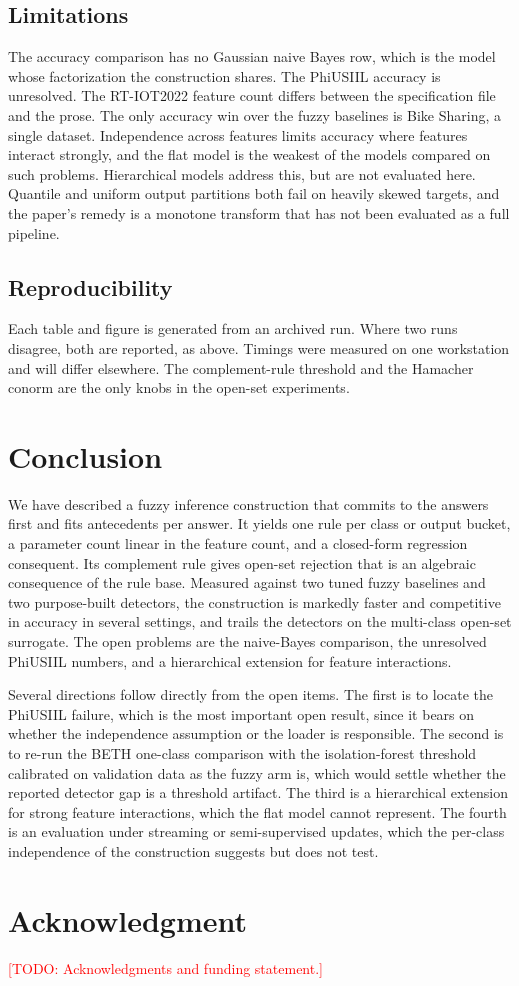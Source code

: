 \documentclass[journal]{IEEEtran}
\newcommand{\todo}[1]{\textcolor{red}{[TODO: #1]}}
\begin{document}
\subsection{Limitations}
The accuracy comparison has no Gaussian naive Bayes row, which is the model whose factorization the construction shares. The PhiUSIIL accuracy is unresolved. The RT-IOT2022 feature count differs between the specification file and the prose. The only accuracy win over the fuzzy baselines is Bike Sharing, a single dataset. Independence across features limits accuracy where features interact strongly, and the flat model is the weakest of the models compared on such problems. Hierarchical models address this, but are not evaluated here. Quantile and uniform output partitions both fail on heavily skewed targets, and the paper's remedy is a monotone transform that has not been evaluated as a full pipeline.

\subsection{Reproducibility}
Each table and figure is generated from an archived run. Where two runs disagree, both are reported, as above. Timings were measured on one workstation and will differ elsewhere. The complement-rule threshold and the Hamacher conorm are the only knobs in the open-set experiments.

\section{Conclusion}
We have described a fuzzy inference construction that commits to the answers first and fits antecedents per answer. It yields one rule per class or output bucket, a parameter count linear in the feature count, and a closed-form regression consequent. Its complement rule gives open-set rejection that is an algebraic consequence of the rule base. Measured against two tuned fuzzy baselines and two purpose-built detectors, the construction is markedly faster and competitive in accuracy in several settings, and trails the detectors on the multi-class open-set surrogate. The open problems are the naive-Bayes comparison, the unresolved PhiUSIIL numbers, and a hierarchical extension for feature interactions.

Several directions follow directly from the open items. The first is to locate the PhiUSIIL failure, which is the most important open result, since it bears on whether the independence assumption or the loader is responsible. The second is to re-run the BETH one-class comparison with the isolation-forest threshold calibrated on validation data as the fuzzy arm is, which would settle whether the reported detector gap is a threshold artifact. The third is a hierarchical extension for strong feature interactions, which the flat model cannot represent. The fourth is an evaluation under streaming or semi-supervised updates, which the per-class independence of the construction suggests but does not test.

\section*{Acknowledgment}
\todo{Acknowledgments and funding statement.}



\end{document}
